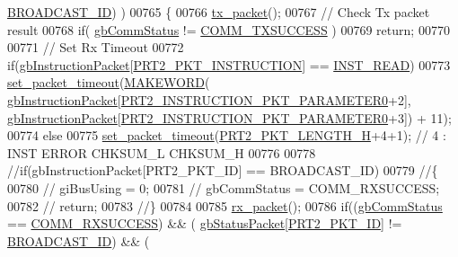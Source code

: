 \begin{DoxyCode}
      \hyperlink{dynamixel_8h_ab9fe47395310b34fa1ceb112c9ca10e2}{BROADCAST\_ID}) )
00765     \{
00766         \hyperlink{classdynamixel2_a526e395e15fbf50ffbc8ce0853b08233}{tx\_packet}();
00767         \textcolor{comment}{// Check Tx packet result}
00768         \textcolor{keywordflow}{if}( \hyperlink{classdynamixel2_a703e327ba8ec5909c238dc94a00cb32d}{gbCommStatus} != \hyperlink{dynamixel_8h_aac6d30f996256b24d311de81eb0f0c1e}{COMM\_TXSUCCESS} )
00769             \textcolor{keywordflow}{return};
00770 
00771         \textcolor{comment}{// Set Rx Timeout}
00772         \textcolor{keywordflow}{if}(\hyperlink{classdynamixel2_a298efe9115fdbf77019af1001e801fb4}{gbInstructionPacket}[\hyperlink{dynamixel_8h_aece9dd9d7c0fa1714d53c568865d79ad}{PRT2\_PKT\_INSTRUCTION}] == 
      \hyperlink{dynamixel_8h_a60599b6587736bb05efb8ea3c5e5f87f}{INST\_READ})
00773             \hyperlink{classdynamixel2_a132d723a321ba225f75f2c79e5d4d27b}{set\_packet\_timeout}(\hyperlink{dynamixel_8h_a6b98c16b8e3e7733dd4063d0b0fac24c}{MAKEWORD}(
      \hyperlink{classdynamixel2_a298efe9115fdbf77019af1001e801fb4}{gbInstructionPacket}[\hyperlink{dynamixel_8h_a349ccb89ae957bdcc16856ec8e2dcb00}{PRT2\_INSTRUCTION\_PKT\_PARAMETER0}+2], 
      \hyperlink{classdynamixel2_a298efe9115fdbf77019af1001e801fb4}{gbInstructionPacket}[\hyperlink{dynamixel_8h_a349ccb89ae957bdcc16856ec8e2dcb00}{PRT2\_INSTRUCTION\_PKT\_PARAMETER0}+3]) +
       11);
00774         \textcolor{keywordflow}{else}
00775             \hyperlink{classdynamixel2_a132d723a321ba225f75f2c79e5d4d27b}{set\_packet\_timeout}(\hyperlink{dynamixel_8h_a5ea18a21d722bf72217d5408c4d2a868}{PRT2\_PKT\_LENGTH\_H}+4+1);    \textcolor{comment}{// 4 : INST
       ERROR CHKSUM\_L CHKSUM\_H}
00776 
00778         \textcolor{comment}{//if(gbInstructionPacket[PRT2\_PKT\_ID] == BROADCAST\_ID)}
00779         \textcolor{comment}{//\{}
00780         \textcolor{comment}{//  giBusUsing = 0;}
00781         \textcolor{comment}{//  gbCommStatus = COMM\_RXSUCCESS;}
00782         \textcolor{comment}{//  return;}
00783         \textcolor{comment}{//\}}
00784 
00785         \hyperlink{classdynamixel2_a7ca03821f030981263c55f2ae2786c4c}{rx\_packet}();
00786         \textcolor{keywordflow}{if}((\hyperlink{classdynamixel2_a703e327ba8ec5909c238dc94a00cb32d}{gbCommStatus} == \hyperlink{dynamixel_8h_a171328d9f298535c18d079f65e631434}{COMM\_RXSUCCESS}) && (
      \hyperlink{classdynamixel2_a0776f210a190cf57d1a6faf9697a593d}{gbStatusPacket}[\hyperlink{dynamixel_8h_a3524b007f8f56ad0d80c1d0caf7e968a}{PRT2\_PKT\_ID}] != \hyperlink{dynamixel_8h_ab9fe47395310b34fa1ceb112c9ca10e2}{BROADCAST\_ID}) && (

\end{DoxyCode}
